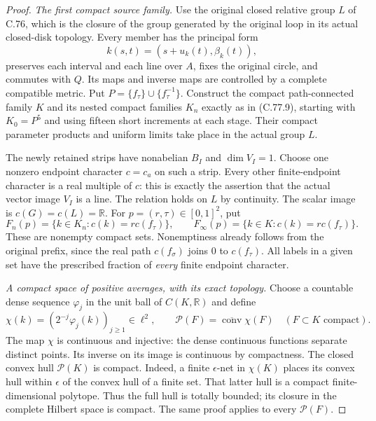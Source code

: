 \begin{proof}
\emph{The first compact source family.}
Use the original closed relative group $L$ of C.76,
which is the closure of the group generated by the
original loop in its actual closed-disk topology.
Every member has the principal form
\[
                    k(s,t)=(s+u_k(t),\beta_k(t)),
                                                               \tag{C.78.3}
\]
preserves each interval and each line over $A$,
fixes the original circle, and commutes with $Q$.
Its maps and inverse maps are controlled by a
complete compatible metric. Put
$P=\{f_\tau\}\cup\{f_\tau^{-1}\}$.
Construct the compact path-connected family $K$
and its nested compact families $K_n$ exactly as
in (C.77.9), starting with $K_0=P^5$ and using
fifteen short increments at each stage. Their
compact parameter products and uniform limits
take place in the actual group $L$.

The newly retained strips have nonabelian $B_I$
and $\dim V_I=1$. Choose one nonzero endpoint
character $c=c_a$ on such a strip. Every other
finite-endpoint character is a real multiple of
$c$: this is exactly the assertion that the
actual vector image $V_I$ is a line. The relation
holds on $L$ by continuity. The scalar image is
$c(G)=c(L)=\mathbb R$.
For $p=(r,\tau)\in[0,1]^2$, put
\[
       F_n(p)=\{k\in K_n:c(k)=r c(f_\tau)\},\qquad
       F_\infty(p)=\{k\in K:c(k)=r c(f_\tau)\}.
                                                               \tag{C.78.4}
\]
These are nonempty compact sets. Nonemptiness
already follows from the original prefix, since
the real path $c(f_\sigma)$ joins $0$ to $c(f_\tau)$.
All labels in a given set have the prescribed
fraction of \emph{every} finite endpoint character.

\emph{A compact space of positive averages, with its exact topology.}
Choose a countable dense sequence $\varphi_j$ in
the unit ball of $C(K,\mathbb R)$ and define
\[
       \chi(k)=(2^{-j}\varphi_j(k))_{j\geq1}\in\ell^2,
       \qquad
       \mathcal P(F)=\overline{\operatorname{conv}}\chi(F)
                              \quad(F\subset K\text{ compact}).
                                                               \tag{C.78.5}
\]
The map $\chi$ is continuous and injective: the
dense continuous functions separate distinct points.
Its inverse on its image is continuous by compactness.
The closed convex hull $\mathcal P(K)$ is compact.
Indeed, a finite $\epsilon$-net in $\chi(K)$ places
its convex hull within $\epsilon$ of the convex
hull of a finite set. That latter hull is a compact
finite-dimensional polytope. Thus the full hull
is totally bounded; its closure in the complete
Hilbert space is compact. The same proof applies
to every $\mathcal P(F)$.


\end{proof}
